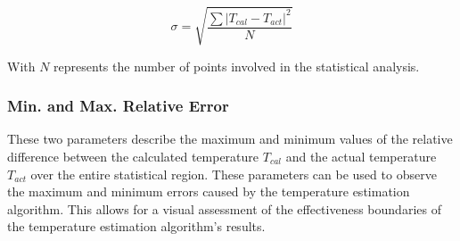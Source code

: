 \begin{equation}
    \sigma = \sqrt{\frac{\sum {\left\lvert T_{cal} - T_{act}\right\rvert }^2}{N}} 
\end{equation}

With $N$ represents the number of points involved in the statistical analysis.

\subsubsection{Min. and Max. Relative Error}
These two parameters describe the maximum and minimum values of the relative 
difference between the calculated temperature $T_{cal}$ and the actual temperature 
$T_{act}$ over the entire statistical region. These parameters can be used to 
observe the maximum and minimum errors caused by the temperature estimation 
algorithm. This allows for a visual assessment of the effectiveness boundaries 
of the temperature estimation algorithm's results.



